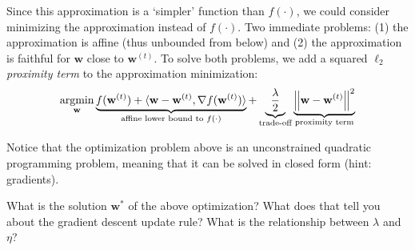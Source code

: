 \documentclass[11pt,english]{article}
\begin{document}
\begin{enumerate}[start=1]
Since this approximation
is a `simpler' function than $f(\cdot)$, we could consider minimizing the approximation instead of $f(\cdot)$.
Two immediate problems: (1) the approximation is affine (thus unbounded from below) and
(2) the approximation is faithful for $\mathbf{w}$ close to $\mathbf{w}^{(t)}$.
To solve both problems, we add a squared $\ell_2$ \emph{proximity term} to the approximation minimization:
\begin{equation}
\mathop{\mathrm{argmin}}_\mathbf{w}
\underbrace{
f(\mathbf{w}^{(t)}) + \langle \mathbf{w}-\mathbf{w}^{(t)}, \nabla f(\mathbf{w}^{(t)}) \rangle
}_{\text{affine lower bound to $f(\cdot)$}}
+
\underbrace{
\frac{\lambda}{2}
}_{\text{trade-off}}
\underbrace{
\left| \hspace{-0.7pt}\left|\mathbf{w} - \mathbf{w}^{(t)}\right| \hspace{-0.7pt}\right|^2
}_{\text{proximity term}}
\end{equation}

Notice that the optimization problem above is an unconstrained quadratic programming problem,
meaning that it can be solved in closed form (hint: gradients).

What is the solution $\mathbf{w}^*$ of the above optimization?
What does that tell you about the gradient descent update rule?
What is the relationship between $\lambda$ and $\eta$?


\end{enumerate}

\newpage
\end{document}
